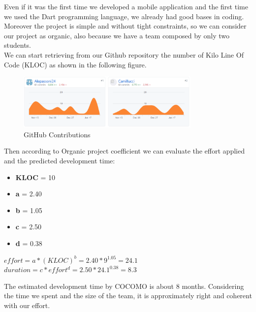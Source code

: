 Even if it was the first time we developed a mobile application and the first time we used the Dart programming language, we already had good bases in coding.
Moreover the project is simple and without tight constraints, so we can consider our project as organic, also because we have a team composed by only two students.\\
We can start retrieving from our Github repository the number of Kilo Line Of Code (KLOC) as shown in the following figure.\\
\begin{figure}[H]
		\begin{center}
			\centering
			\includegraphics[width=0.8\textwidth]{img/RepoInsights.png}
			\caption{GitHub Contributions}
		\end{center}
	\end{figure}
Then according to Organic project coefficient we can evaluate the effort applied and the predicted development time:

\begin{itemize}
	\item \textbf{KLOC} = 10
	\item \textbf{a} = 2.40
	\item \textbf{b} = 1.05
	\item \textbf{c} = 2.50
	\item \textbf{d} = 0.38
\end{itemize}

\begin{center}
$ effort = a * (KLOC)^{b} = 2.40 * 9^{1.05} = 24.1 $\\
$ duration = c * effort^{d} = 2.50 * 24.1 ^{0.38} = 8.3 $\\
\end{center}

The estimated development time by COCOMO is about 8 months.
Considering the time we spent and the size of the team, it is approximately right and coherent with our effort.
  